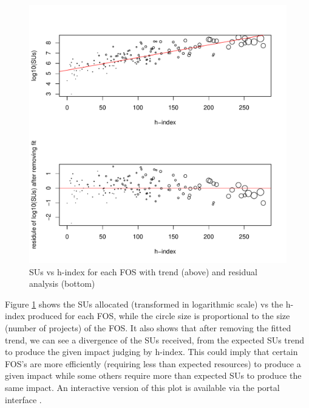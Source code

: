 \documentclass{sig-alternate}
\begin{document}
\begin{figure}[!htb] 
  \centering 
    \includegraphics[width=1.0\columnwidth]{images/05_alloc_vs_hindex_fos_sized_2in1.pdf} 
  \caption{SUs vs h-index for each FOS with trend (above) and residual analysis (bottom)}\label{F:alloc-vs-hindex-fos-sized} 
\end{figure} 

Figure \ref{F:alloc-vs-hindex-fos-sized} shows the SUs allocated
(transformed in logarithmic scale) vs the h-index produced for each
FOS, while the circle size is proportional to the size (number of
projects) of the FOS. It also shows that after removing the fitted
trend, we can see a divergence of the SUs received, from the expected
SUs trend to produce the given impact judging by h-index. This could
imply that certain FOS's are more efficiently (requiring less than
expected resources) to produce a given impact while some others
require more than expected SUs to produce the same impact. An
interactive version of this plot is available via the portal interface
\cite{www-tasdeviu}.
\end{document}
